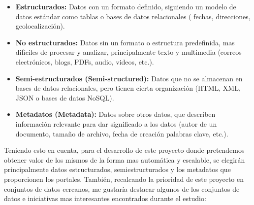 	\begin{itemize} \label{tipos_de_datos}
		\item \textbf{Estructurados:} Datos con un formato definido, siguiendo un modelo de datos estándar como tablas o bases de datos relacionales ( fechas, direcciones, geolocalización).
		
		\item \textbf{No estructurados:} Datos sin un formato o estructura predefinida, mas difíciles de procesar y analizar, principalmente texto y multimedia (correos electrónicos, blogs, PDFs, audio, videos, etc.).
		
		\item \textbf{Semi-estructurados (Semi-structured):} Datos que no se almacenan en bases de datos relacionales, pero tienen cierta organización (HTML, XML, JSON o bases de datos NoSQL).
		
		\item \textbf{Metadatos (Metadata):} Datos sobre otros datos, que describen información relevante para dar significado a los datos (autor de un documento, tamaño de archivo, fecha de creación palabras clave, etc.).
	\end{itemize}

	Teniendo esto en cuenta, para el desarrollo de este proyecto donde pretendemos obtener valor de los mismos de la forma mas automática y escalable, se elegirán principalmente datos estructurados, semiestructurados y los metadatos que proporcionen los portales. También, recalcando la prioridad de este proyecto en conjuntos de datos cercanos, me gustaría destacar algunos de los conjuntos de datos e iniciativas mas interesantes encontrados durante el estudio:
	
